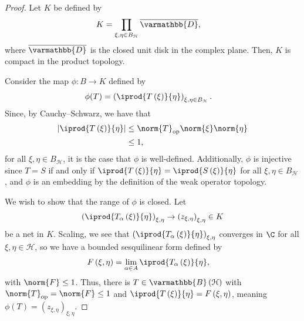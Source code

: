 \documentclass[10pt]{mypackage}
\renewcommand*{\mathbb}[1]{\varmathbb{#1}}
\newcommand{\B}{\mathbb{B}}
\begin{document}
\begin{proof}
  Let $K$ be defined by
  \begin{align*}
    K &= \prod_{\xi,\eta\in B_{\mathcal{H}}}\overline{\mathbb{D}},
  \end{align*}
  where $\overline{\mathbb{D}}$ is the closed unit disk in the complex plane. Then, $K$ is compact in the product topology.\newline

  Consider the map $\phi\colon B\rightarrow K$ defined by
  \begin{align*}
    \phi(T) &= \left( \iprod{T\left(\xi\right)}{\eta}\right)_{\xi,\eta\in B_{\mathcal{H}}}.
  \end{align*}
  Since, by Cauchy--Schwarz, we have that
  \begin{align*}
    \left\vert \iprod{T\left(\xi\right)}{\eta} \right\vert &\leq \norm{T}_{\text{op}}\norm{\xi}\norm{\eta}\\
                                                           &\leq 1,
  \end{align*}
  for all $\xi,\eta\in B_{\mathcal{H}}$, it is the case that $\phi$ is well-defined. Additionally, $\phi$ is injective since $T = S$ if and only if $ \iprod{T\left(\xi\right)}{\eta} = \iprod{S\left(\xi\right)}{\eta} $ for all $\xi,\eta\in B_{\mathcal{H}}$, and $\phi$ is an embedding by the definition of the weak operator topology.\newline

  We wish to show that the range of $\phi$ is closed. Let
  \begin{align*}
    \left( \iprod{T_{\alpha}\left(\xi\right)}{\eta}\right)_{\xi,\eta} \rightarrow \left(z_{\xi,\eta}\right)_{\xi,\eta}\in K
  \end{align*}
  be a net in $K$. Scaling, we see that $\left( \iprod{T_{\alpha}\left(\xi\right)}{\eta}\right)_{\xi,\eta}$ converges in $\C$ for all $\xi,\eta\in \mathcal{H}$, so we have a bounded sesquilinear form defined by
  \begin{align*}
    F\left(\xi,\eta\right) &= \lim_{\alpha \in A} \iprod{T_{\alpha}\left(\xi\right)}{\eta},
  \end{align*}
  with $\norm{F} \leq 1$. Thus, there is $T\in \B\left(\mathcal{H}\right)$ with $\norm{T}_{\text{op}} = \norm{F} \leq 1$ and $ \iprod{T\left(\xi\right)}{\eta} = F\left(\xi,\eta\right) $, meaning $\phi(T) = \left(z_{\xi,\eta}\right)_{\xi,\eta}$.
\end{proof}
\end{document}
